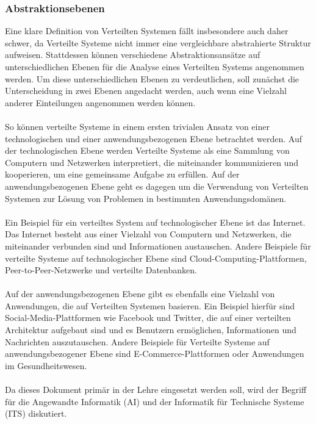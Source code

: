 \subsubsection{Abstraktionsebenen}
Eine klare Definition von Verteilten Systemen fällt insbesondere auch daher schwer, da Verteilte Systeme nicht immer eine vergleichbare abstrahierte Struktur aufweisen. Stattdessen können verschiedene Abstraktionsansätze auf unterschiedlichen Ebenen für die Analyse eines Verteilten Systems angenommen werden. Um diese unterschiedlichen Ebenen zu verdeutlichen, soll zunächst die Unterscheidung in zwei Ebenen angedacht werden, auch wenn eine Vielzahl anderer Einteilungen angenommen werden können. 
\\\\
So können verteilte Systeme in einem ersten trivialen Ansatz von einer technologischen und einer anwendungsbezogenen Ebene betrachtet werden\cite{coulouris2012distributed}. Auf der technologischen Ebene werden Verteilte Systeme als eine Sammlung von Computern und Netzwerken interpretiert, die miteinander kommunizieren und kooperieren, um eine gemeinsame Aufgabe zu erfüllen. Auf der anwendungsbezogenen Ebene geht es dagegen um die Verwendung von Verteilten Systemen zur Lösung von Problemen in bestimmten Anwendungsdomänen.
\\\\
Ein Beispiel für ein verteiltes System auf technologischer Ebene ist das Internet. Das Internet besteht aus einer Vielzahl von Computern und Netzwerken, die miteinander verbunden sind und Informationen austauschen. Andere Beispiele für verteilte Systeme auf technologischer Ebene sind Cloud-Computing-Plattformen, Peer-to-Peer-Netzwerke und verteilte Datenbanken.
\\\\
Auf der anwendungsbezogenen Ebene gibt es ebenfalls eine Vielzahl von Anwendungen, die auf Verteilten Systemen basieren. Ein Beispiel hierfür sind Social-Media-Plattformen wie Facebook und Twitter, die auf einer verteilten Architektur aufgebaut sind und es Benutzern ermöglichen, Informationen und Nachrichten auszutauschen. Andere Beispiele für Verteilte Systeme auf anwendungsbezogener Ebene sind E-Commerce-Plattformen oder Anwendungen im Gesundheitswesen.
\\\\
Da dieses Dokument primär in der Lehre eingesetzt werden soll, wird der Begriff für die Angewandte Informatik (AI) und der Informatik für Technische Systeme (ITS) diskutiert. 


